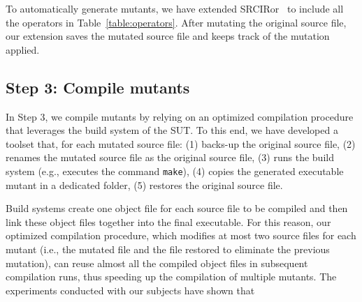 

To automatically generate mutants, we have extended SRCIRor~\cite{hariri2018srciror} to include all the
operators in Table~\ref{table:operators}.
After mutating the original source file, our extension saves the mutated source file and keeps track of the mutation applied.

\subsection{Step 3: Compile mutants}
\label{sec:appr:compile}

In Step 3, we
compile mutants by relying on an optimized compilation procedure that leverages the build system of the SUT. To this end, we have developed a toolset that, for each mutated source file: (1) backs-up the original source file, (2) renames the mutated source file as the original source file, (3) runs the build system (e.g., executes the command \texttt{make}), (4) copies the generated executable mutant in a dedicated folder, (5) restores the original source file.

Build systems  create one object file for each source file to be compiled and then link these object files together into the final executable.
For this reason, our optimized compilation procedure, which modifies at most two source files for each mutant (i.e., the mutated file and the file restored to eliminate the previous mutation), can reuse almost all the compiled object files in subsequent compilation runs, thus speeding up the compilation of multiple mutants. The experiments conducted with our subjects have shown that


